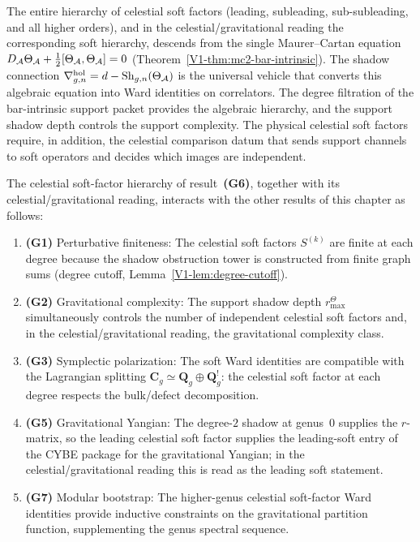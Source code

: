\begin{remark}
The entire hierarchy of celestial soft factors (leading,
subleading, sub-subleading, and all higher orders), and in the
celestial/gravitational reading the corresponding soft
hierarchy, descends from
the single Maurer--Cartan equation
$D_{\mathcal{A}}\Theta_{\mathcal{A}} + \tfrac{1}{2}[\Theta_{\mathcal{A}},\Theta_{\mathcal{A}}] = 0$
(Theorem~\ref*{V1-thm:mc2-bar-intrinsic}). The shadow connection
$\nabla^{\mathrm{hol}}_{g,n} = d - \operatorname{Sh}_{g,n}(\Theta_{\mathcal{A}})$ is
the universal vehicle that converts this algebraic equation into
Ward identities on correlators. The degree filtration of the
bar-intrinsic support packet provides the algebraic hierarchy, and the
support shadow depth controls the support complexity.  The physical
celestial soft factors require, in addition, the celestial comparison
datum that sends support channels to soft operators and decides which
images are independent.
\end{remark}

\begin{remark}
The celestial soft-factor hierarchy of result~\textbf{(G6)},
together with its celestial/gravitational reading, interacts with
the other results of this chapter as follows:
\begin{enumerate}[label=\textup{(\alph*)}]
\item \textbf{(G1)} Perturbative finiteness: The celestial soft factors
 $S^{(k)}$ are finite at each degree because the shadow
 obstruction tower is constructed from finite graph sums
 (degree cutoff, Lemma~\ref{V1-lem:degree-cutoff}).
\item \textbf{(G2)} Gravitational complexity: The support shadow depth
 \(r^\Theta_{\max}\) simultaneously controls the number of independent
 celestial soft factors and, in the celestial/gravitational
 reading, the gravitational complexity class.
\item \textbf{(G3)} Symplectic polarization: The soft Ward
 identities are compatible with the Lagrangian splitting
 $\mathbf{C}_g \simeq \mathbf{Q}_g \oplus \mathbf{Q}_g^!$:
 the celestial soft factor at each degree respects the bulk/defect
 decomposition.
\item \textbf{(G5)} Gravitational Yangian: The degree-$2$ shadow
 at genus~$0$ supplies the $r$-matrix, so the leading celestial soft
 factor supplies the leading-soft entry of the CYBE package for
 the gravitational Yangian; in the celestial/gravitational
 reading this is read as the leading soft statement.
\item \textbf{(G7)} Modular bootstrap: The higher-genus celestial
 soft-factor Ward identities provide inductive constraints on the
 gravitational partition function, supplementing the genus
 spectral sequence.
\end{enumerate}
\end{remark}

